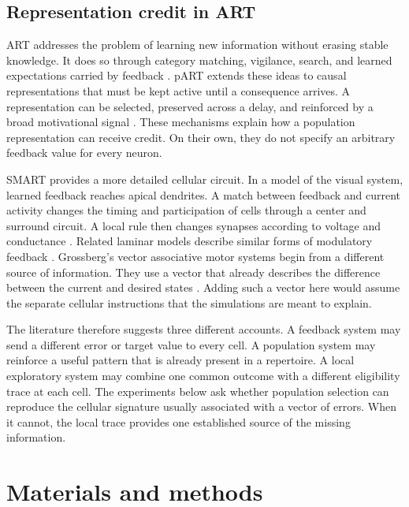 \documentclass[11pt]{article}
\begin{document}
\subsection{Representation credit in ART}
ART addresses the problem of learning new information without erasing stable knowledge. It does so through category matching, vigilance, search, and learned expectations carried by feedback \citep{carpenter1987}. pART extends these ideas to causal representations that must be kept active until a consequence arrives. A representation can be selected, preserved across a delay, and reinforced by a broad motivational signal \citep{grossberg2018}. These mechanisms explain how a population representation can receive credit. On their own, they do not specify an arbitrary feedback value for every neuron.

SMART provides a more detailed cellular circuit. In a model of the visual system, learned feedback reaches apical dendrites. A match between feedback and current activity changes the timing and participation of cells through a center and surround circuit. A local rule then changes synapses according to voltage and conductance \citep{grossbergversace2008}. Related laminar models describe similar forms of modulatory feedback \citep{grossberg2021}. Grossberg's vector associative motor systems begin from a different source of information. They use a vector that already describes the difference between the current and desired states \citep{gaudiano1991}. Adding such a vector here would assume the separate cellular instructions that the simulations are meant to explain.

The literature therefore suggests three different accounts. A feedback system may send a different error or target value to every cell. A population system may reinforce a useful pattern that is already present in a repertoire. A local exploratory system may combine one common outcome with a different eligibility trace at each cell. The experiments below ask whether population selection can reproduce the cellular signature usually associated with a vector of errors. When it cannot, the local trace provides one established source of the missing information.

\section{Materials and methods}
\end{document}
